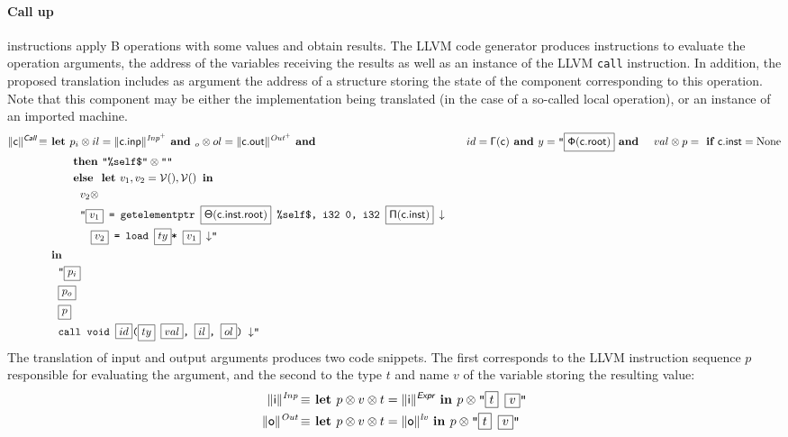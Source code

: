 \documentclass{llncs}
\newcommand{\trad}[2]{\ensuremath{\lVert \textsf{#1} \rVert^{\textit{#2}}}}
\newcommand{\nl}[0]{\ensuremath{\downarrow}}
\DeclareMathOperator{\isdef}{\equiv}
\DeclareMathOperator{\variable}{\mathcal{V}()}
\newcommand{\llvm}[1]{\texttt{#1}}
\newcommand{\B}[1]{\textsf{#1}}
\newcommand{\ListOf}[1]{$\mbox{#1}^+$}
\newcommand{\IF}[0]{\textbf{ if }}
\newcommand{\ELSE}[0]{\textbf{ else }}
\newcommand{\THEN}[0]{\textbf{ then }}
\newcommand{\LET}[0]{\textbf{ let }}
\newcommand{\IN}[0]{\textbf{ in }}
\newcommand{\AND}[1]{\textbf{ and }}
\newcommand{\PH}[1]{\framebox{$#1$}}
\newcommand{\sep}[0]{\otimes}
\newcommand{\Global}[0]{\ensuremath{\sf\Gamma}}
\newcommand{\idx}[0]{\ensuremath{\sf\Pi}}
\newcommand{\state}[0]{\ensuremath{\sf\Theta}}
\newcommand{\stateref}[0]{\ensuremath{\sf\Phi}}
\begin{document}
\paragraph{Call up} instructions apply B operations with some values and obtain
results. The LLVM code generator produces instructions to evaluate the operation
arguments, the address of the variables receiving the results as well as an
instance of the LLVM \llvm{call} instruction. In addition, the proposed
translation includes as argument the address of a structure storing the state of
the component corresponding to this operation. Note that this component may be
either the implementation being translated (in the case of a so-called local
operation), or an instance of an imported machine.
\begin{align*}
  \trad{c}{\B{Call}} \isdef
  & \LET p_i \sep il = \trad{c.inp}{\ListOf{Inp}} \AND p_o \sep ol =
  \trad{c.out}{\ListOf{Out}} \AND \\
  & \quad id = {\Global(\B{c})} \AND ty = \llvm{"\PH{\stateref(\B{c.root})}} \AND \\
  & \quad val \sep p = \IF \B{c.inst} = \text{None} \\
  & \quad \quad \THEN \llvm{"\%self\$"} \sep \llvm{""} \\
  & \quad \quad \ELSE \LET v_1, v_2 = \variable, \variable \IN \\
  & \quad \quad \quad v_2 \sep \\
  & \quad \quad \quad \llvm{"\PH{v_1} = getelementptr \PH{ \state({\B{c.inst.root}})} \%self\$, i32 0, i32 \PH{\idx(\B{c.inst})} \nl} \\
  & \quad \quad \quad \quad \llvm{\PH{v_2} = load \PH{ty}* \PH{v_1} \nl"} \\
  & \IN \\
  & \quad \llvm{"\PH{p_i}} \\
  & \quad \llvm{\PH{p_o}} \\
  & \quad \llvm{\PH{p}} \\
  & \quad \llvm{call void \PH{id}(\PH{ty} \PH{val}, \PH{il}, \PH{ol}) \nl"}
\end{align*}
The translation of input and output arguments produces two code snippets. The
first corresponds to the LLVM instruction sequence $p$ responsible for
evaluating the argument, and the second to the type $t$ and name $v$ of the
variable storing the resulting value:
\begin{align*}
  \trad{i}{Inp} \isdef
  & \LET p \sep v \sep t = \trad{i}{\B{Expr}} \IN p \sep \llvm{"\PH{t} \PH{v}"}\\
  \trad{o}{Out} \isdef
  & \LET p \sep v \sep t = \trad{o}{lv} \IN p \sep \llvm{"\PH{t} \PH{v}"}
\end{align*}
\end{document}
